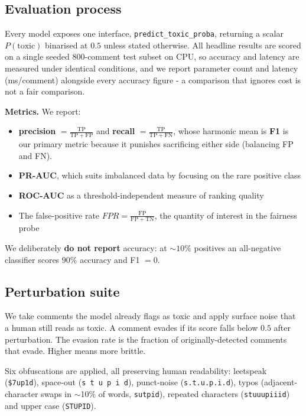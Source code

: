 \documentclass[10pt,a4paper]{article}
\begin{document}
\subsection{Evaluation process}
\label{sec:protocol}
Every model exposes one interface, \texttt{predict\_toxic\_proba}, returning a
scalar $P(\text{toxic})$ binarised at $0.5$ unless stated otherwise. All headline
results are scored on a single seeded $800$-comment test subset on CPU, so accuracy
and latency are measured under identical conditions, and we report parameter count
and latency (ms/comment) alongside every accuracy figure - a comparison that
ignores cost is not a fair comparison.


\textbf{Metrics.} We report:
\begin{itemize}
    \item \textbf{precision} $=\frac{\mathrm{TP}}{\mathrm{TP}{+}\mathrm{FP}}$ and \textbf{recall} $=\frac{\mathrm{TP}}{\mathrm{TP}{+}\mathrm{FN}}$, whose harmonic mean is \textbf{F1} is our primary metric because it punishes sacrificing either side (balancing FP and FN).
    \item \textbf{PR-AUC}, which suits imbalanced data by focusing on the rare positive class
    \item \textbf{ROC-AUC} as a threshold-independent measure of ranking quality
    \item The false-positive rate $FPR=\frac{\mathrm{FP}}{\mathrm{FP}{+}\mathrm{TN}}$, the quantity of interest in the fairness probe
\end{itemize}
We deliberately \textbf{do not report} accuracy: at ${\sim}10\%$ positives
an all-negative classifier scores $90\%$ accuracy and F1 $=0$.

\subsection{Perturbation suite}

We take comments the model already flags as toxic and apply surface noise that a
human still reads as toxic. A comment evades if its score falls below
$0.5$ after perturbation. The evasion rate is the fraction of originally-detected
comments that evade. Higher means more brittle.

Six obfuscations are applied, all preserving human readability: leetspeak
(\texttt{\$7up1d}), space-out (\texttt{s t u p i d}), punct-noise (\texttt{s.t.u.p.i.d}),
typos (adjacent-character swaps in $\sim$10\% of words, \texttt{sutpid}), repeated
characters (\texttt{stuuupiiid}) and upper case (\texttt{STUPID}).
\end{document}
